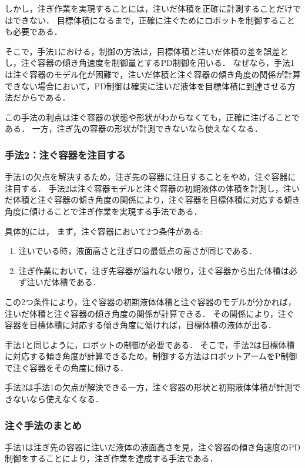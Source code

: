 		しかし，注ぎ作業を実現することには，注いだ体積を正確に計測することだけではできない．
		目標体積になるまで，正確に注ぐためにロボットを制御することも必要である．
		
		そこで，手法1における，制御の方法は，目標体積と注いだ体積の差を誤差とし，注ぐ容器の傾き角速度を制御量とするPD制御を用いる．
		なぜなら，手法1は注ぐ容器のモデル化が困難で，注いだ体積と注ぐ容器の傾き角度の関係が計算できない場合において，PD制御は確実に注いだ液体を目標体積に到達させる方法だからである．
				
		この手法の利点は注ぐ容器の状態や形状がわからなくても，正確に注げることである．
		一方，注ぎ先の容器の形状が計測できないなら使えなくなる．
		
		\subsubsection{手法2：注ぐ容器を注目する}\label{sec:pour-method2}
		手法1の欠点を解決するため，注ぎ先の容器に注目することをやめ，注ぐ容器に注目する．
		手法2は注ぐ容器モデルと注ぐ容器の初期液体の体積を計測し，注いだ体積と注ぐ容器の傾き角度の関係により，注ぐ容器を目標体積に対応する傾き角度に傾けることで注ぎ作業を実現する手法である．
		
		具体的には，
		まず，注ぐ容器において2つ条件がある:
		\begin{enumerate}
			\item 注いでいる時，液面高さと注ぎ口の最低点の高さが同じである．
			\item 注ぎ作業において，注ぎ先容器が溢れない限り，注ぐ容器から出た体積は必ず注いだ体積である．
		\end{enumerate}
		この2つ条件により，注ぐ容器の初期液体体積と注ぐ容器のモデルが分かれば，注いだ体積と注ぐ容器の傾き角度の関係が計算できる．
		その関係により，注ぐ容器を目標体積に対応する傾き角度に傾ければ，目標体積の液体が出る．
		
		手法1と同じように，ロボットの制御が必要である．
		そこで，手法2は目標体積に対応する傾き角度が計算できるため，制御する方法はロボットアームをP制御で注ぐ容器をその角度に傾ける．
		
		手法2は手法1の欠点が解決できる一方，注ぐ容器の形状と初期液体体積が計測できないなら使えなくなる．
			
		\subsubsection{注ぐ手法のまとめ}
		手法1は注ぎ先の容器に注いだ液体の液面高さを見，注ぐ容器の傾き角速度のPD制御をすることにより，注ぎ作業を達成する手法である．
		
